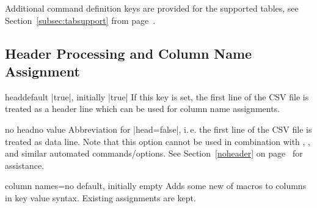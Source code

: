 \documentclass[a4paper,11pt]{ltxdoc}
\begin{document}
\begin{dispExample}
%
\end{dispExample}

Additional command definition keys are provided for the supported tables,
see Section~\ref{subsec:tabsupport} from page~\pageref{subsec:tabsupport}.

\clearpage
\subsection{Header Processing and Column Name Assignment}%

\begin{docCsvKey}{head}{}{default |true|, initially |true|}
  If this key is set, the first line of the CSV file is treated as a header
  line which can be used for column name assignments.
\end{docCsvKey}


\begin{docCsvKey}{no head}{}{no value}
  Abbreviation for |head=false|, i.\,e. the first line of the CSV file is
  treated as data line.
  Note that this option cannot be used in combination with
  , , and similar automated commands/options.
  See Section~\ref{noheader} on page~\pageref{noheader} for assistance.
\end{docCsvKey}

\begin{docCsvKey}{column names}{=}{no default, initially empty}
  Adds some new  of macros to columns in key value syntax.
  Existing assignments are kept.
\end{docCsvKey}
\end{document}
